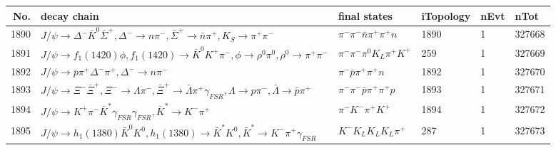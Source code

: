 \begin{table}[htbp] 
\begin{center}
\begin{small}
\begin{tabular}{rlllll}\hline\hline
 No. & decay chain & final states &  iTopology & nEvt & nTot \\\hline
1890&$J/\psi       \rightarrow \Delta^-          \bar{K}^{0}   \bar{\Sigma}^+   , \Delta^-           \rightarrow n                 \pi^{-}        , \bar{\Sigma}^+    \rightarrow \bar{n}          \pi^{+}        , K_{S}           \rightarrow \pi^{+}        \pi^{-}        $&$\pi^{-}        \pi^{-}        \bar{n}          \pi^{+}        \pi^{+}        n                 $& 1890&    1&327668\\
1891&$J/\psi       \rightarrow f_{1}(1420)    \phi           , f_{1}(1420)     \rightarrow \bar{K}^{0}   K^{+}          \pi^{-}        , \phi            \rightarrow \rho^{0}      \pi^{0}        , \rho^{0}       \rightarrow \pi^{+}        \pi^{-}        $&$\pi^{-}        \pi^{-}        \pi^{0}        K_{L}          \pi^{+}        K^{+}          $&  259&    1&327669\\
1892&$J/\psi       \rightarrow \bar{p}          \pi^{+}        \Delta^-          \pi^{+}        , \Delta^-           \rightarrow n                 \pi^{-}        $&$\pi^{-}        \bar{p}          \pi^{+}        \pi^{+}        n                 $& 1892&    1&327670\\
1893&$J/\psi       \rightarrow \Xi^-             \bar{\Xi}^+      , \Xi^-              \rightarrow \Lambda           \pi^{-}        , \bar{\Xi}^+       \rightarrow \bar{\Lambda}    \pi^{+}        \gamma_{FSR} , \Lambda            \rightarrow p                 \pi^{-}        , \bar{\Lambda}     \rightarrow \bar{p}          \pi^{+}        $&$\pi^{-}        \pi^{-}        \bar{p}          \pi^{+}        \pi^{+}        p                 $& 1893&    1&327671\\
1894&$J/\psi       \rightarrow K^{+}          \pi^{-}        \bar{K}^{*}   \gamma_{FSR} \gamma_{FSR} , \bar{K}^{*}    \rightarrow K^{-}          \pi^{+}        $&$\pi^{-}        K^{-}          \pi^{+}        K^{+}          $& 1894&    1&327672\\
1895&$J/\psi       \rightarrow h_{1}(1380)    \bar{K}^{0}   K^{0}          , h_{1}(1380)     \rightarrow \bar{K}^{*}   K^{0}          , \bar{K}^{*}    \rightarrow K^{-}          \pi^{+}        \gamma_{FSR} $&$K^{-}          K_{L}          K_{L}          K_{L}          \pi^{+}        $&  287&    1&327673\\

\end{tabular}
\end{small}
\end{center}
\end{table}
